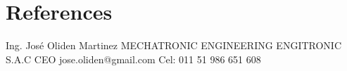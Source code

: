 \section{References}

{Ing. José Oliden Martinez}
{MECHATRONIC ENGINEERING ENGITRONIC S.A.C CEO}
{jose.oliden@gmail.com}{}
{Cel: 011 51 986 651 608}